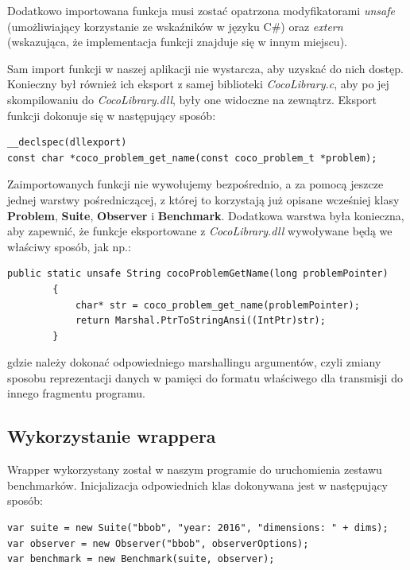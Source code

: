 \documentclass[12pt, twoside, openany, abstract=on]{report}
\theoremstyle{definition}
\begin{document}
Dodatkowo importowana funkcja musi zostać opatrzona modyfikatorami \textit{unsafe} (umożliwiający korzystanie ze wskaźników w języku C\#) oraz \textit{extern} (wskazująca, że implementacja funkcji znajduje się w innym miejscu).

Sam import funkcji w naszej aplikacji nie wystarcza, aby uzyskać do nich dostęp. Konieczny był również ich eksport z samej biblioteki \textit{CocoLibrary.c}, aby po jej skompilowaniu do \textit{CocoLibrary.dll}, były one widoczne na zewnątrz. Eksport funkcji dokonuje się w następujący sposób:\\

\begin{lstlisting}[frame=single]
__declspec(dllexport) 
const char *coco_problem_get_name(const coco_problem_t *problem);
\end{lstlisting}

Zaimportowanych funkcji nie wywołujemy bezpośrednio, a za pomocą jeszcze jednej warstwy pośredniczącej, z której to korzystają już opisane wcześniej klasy \textbf{Problem}, \textbf{Suite}, \textbf{Observer} i \textbf{Benchmark}. Dodatkowa warstwa była konieczna, aby zapewnić, że funkcje eksportowane z \textit{CocoLibrary.dll} wywoływane będą we właściwy sposób, jak np.:

\begin{lstlisting}[frame=single]
public static unsafe String cocoProblemGetName(long problemPointer)
        {
            char* str = coco_problem_get_name(problemPointer);
            return Marshal.PtrToStringAnsi((IntPtr)str);
        }
\end{lstlisting}

gdzie należy dokonać odpowiedniego marshallingu argumentów, czyli zmiany sposobu reprezentacji danych w pamięci do formatu właściwego dla transmisji do innego fragmentu programu.

\subsection{Wykorzystanie wrappera}

Wrapper wykorzystany został w naszym programie do uruchomienia zestawu benchmarków. Inicjalizacja odpowiednich klas dokonywana jest w następujący sposób:

\begin{lstlisting}[frame=single]
var suite = new Suite("bbob", "year: 2016", "dimensions: " + dims);
var observer = new Observer("bbob", observerOptions);
var benchmark = new Benchmark(suite, observer);
\end{lstlisting}
\end{document}
